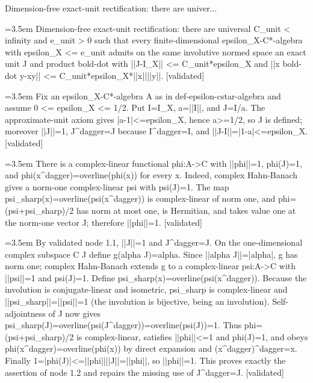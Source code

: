 \documentclass{article}
\newcommand{\step}[1]{\par\noindent\hangindent=3.5em\hangafter=1%
  \makebox[3.5em][l]{\textbf{#1.}}}
\newcommand{\steptag}[1]{\hfill{\small\textsf{[#1]}}}
\begin{document}
\begin{proofbox}{Dimension-free exact-unit rectification: there are univer...}
\step{1} Dimension-free exact-unit rectification: there are universal C\_unit < infinity and e\_unit > 0 such that every finite-dimensional epsilon\_X-C*-algebra with epsilon\_X <= e\_unit admits on the same involutive normed space an exact unit J and product bold-dot with ||J-I\_X|| <= C\_unit*epsilon\_X and ||x bold-dot y-xy|| <= C\_unit*epsilon\_X*||x||||y||. \steptag{validated} \\[6pt]
\step{1.1} Fix an epsilon\_X-C*-algebra A as in def-epsilon-cstar-algebra and assume 0 <= epsilon\_X <= 1/2. Put I=I\_X, a=||I||, and J=I/a. The approximate-unit axiom gives |a-1|<=epsilon\_X, hence a>=1/2, so J is defined; moreover ||J||=1, J\textasciicircum{}dagger=J because I\textasciicircum{}dagger=I, and ||J-I||=|1-a|<=epsilon\_X. \steptag{validated} \\[4pt]
\step{1.2} There is a complex-linear functional phi:A->C with ||phi||=1, phi(J)=1, and phi(x\textasciicircum{}dagger)=overline(phi(x)) for every x. Indeed, complex Hahn-Banach gives a norm-one complex-linear psi with psi(J)=1. The map psi\_sharp(x)=overline(psi(x\textasciicircum{}dagger)) is complex-linear of norm one, and phi=(psi+psi\_sharp)/2 has norm at most one, is Hermitian, and takes value one at the norm-one vector J; therefore ||phi||=1. \steptag{validated} \\[6pt]
\step{1.2.1} By validated node 1.1, ||J||=1 and J\textasciicircum{}dagger=J. On the one-dimensional complex subspace C J define g(alpha J)=alpha. Since ||alpha J||=|alpha|, g has norm one; complex Hahn-Banach extends g to a complex-linear psi:A->C with ||psi||=1 and psi(J)=1. Define psi\_sharp(x)=overline(psi(x\textasciicircum{}dagger)). Because the involution is conjugate-linear and isometric, psi\_sharp is complex-linear and ||psi\_sharp||=||psi||=1 (the involution is bijective, being an involution). Self-adjointness of J now gives psi\_sharp(J)=overline(psi(J\textasciicircum{}dagger))=overline(psi(J))=1. Thus phi=(psi+psi\_sharp)/2 is complex-linear, satisfies ||phi||<=1 and phi(J)=1, and obeys phi(x\textasciicircum{}dagger)=overline(phi(x)) by direct expansion and (x\textasciicircum{}dagger)\textasciicircum{}dagger=x. Finally 1=|phi(J)|<=||phi||||J||=||phi||, so ||phi||=1. This proves exactly the assertion of node 1.2 and repairs the missing use of J\textasciicircum{}dagger=J. \steptag{validated} \\[4pt]

\end{proofbox}
\end{document}
